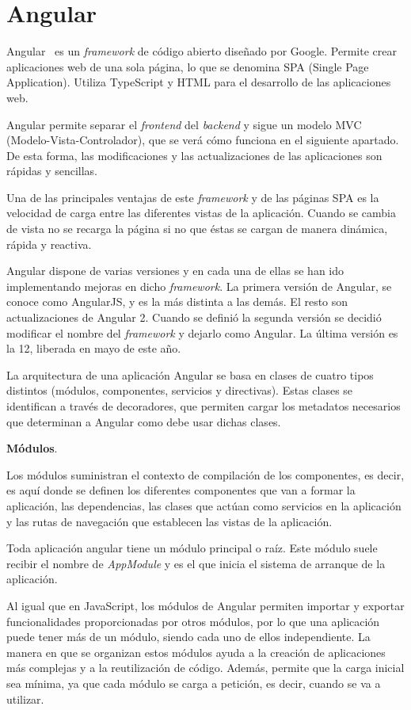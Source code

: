 \documentclass[a4paper, 12pt]{book}
\begin{document}
\section{Angular} 
\label{sec:angular}

Angular~\cite{angular} es un \emph{framework} de código abierto diseñado por Google. Permite crear aplicaciones web de una sola página, lo que se denomina SPA (Single Page Application). Utiliza TypeScript y HTML para el desarrollo de las aplicaciones web. 

Angular permite separar el \emph{frontend} del \emph{backend} y sigue un modelo MVC (Modelo-Vista-Controlador), que se verá cómo funciona en el siguiente apartado. De esta forma, las modificaciones y las actualizaciones de las aplicaciones son rápidas y sencillas. 

Una de las principales ventajas de este \emph{framework} y de las páginas SPA es la velocidad de carga entre las diferentes vistas de la aplicación. Cuando se cambia de vista no se recarga la página si no que éstas se cargan de manera dinámica, rápida y reactiva. 

Angular dispone de varias versiones y en cada una de ellas se han ido implementando mejoras en dicho \emph{framework}. La primera versión de Angular, se conoce como AngularJS, y es la más distinta a las demás. El resto son actualizaciones de Angular 2. Cuando se definió la segunda versión se decidió modificar el nombre del \emph{framework} y dejarlo como Angular. La última versión es la 12, liberada en mayo de este año.

La arquitectura de una aplicación Angular se basa en clases de cuatro tipos distintos (módulos, componentes, servicios y directivas). Estas clases se identifican a través de decoradores, que permiten cargar los metadatos necesarios que determinan a Angular como debe usar dichas clases.

\textbf{Módulos}.

Los módulos suministran el contexto de compilación de los componentes, es decir, es aquí donde se definen los diferentes componentes que van a formar la aplicación, las dependencias, las clases que actúan como servicios en la aplicación y las rutas de navegación que establecen las vistas de la aplicación. 

Toda aplicación angular tiene un módulo principal o raíz. Este módulo suele recibir el nombre de \emph{AppModule} y es el que inicia el sistema de arranque de la aplicación.

Al igual que en JavaScript, los módulos de Angular permiten importar y exportar funcionalidades proporcionadas por otros módulos, por lo que una aplicación puede tener más de un módulo, siendo cada uno de ellos independiente. La manera en que se organizan estos módulos ayuda a la creación de aplicaciones más complejas y a la reutilización de código. Además, permite que la carga inicial sea mínima, ya que cada módulo se carga a petición, es decir, cuando se va a utilizar. 
\end{document}
